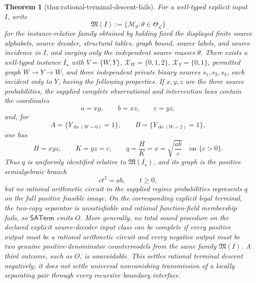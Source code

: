 \documentclass{article}
\newtheorem{theorem}{Theorem}
\begin{document}
\begin{theorem}[thm:rational-terminal-descent-fails]\label{thm:rational-terminal-descent-fails}
For a well-typed explicit input \(I\), write
\[
 \mathfrak M(I):=\{\mathcal M_\theta:\theta\in\Theta_{\mathcal L}\}
\]
for the instance-relative family obtained by holding fixed the displayed finite source alphabets, source decoder, structural tables, graph bound, source labels, and source incidence in \(I\), and varying only the independent source masses \(\theta\).  There exists a well-typed instance \(I_\star\) with \(V=\{W,Y\}\), \(\mathcal X_W=\{0,1,2\}\), \(\mathcal X_Y=\{0,1\}\), permitted graph \(W\to Y\to W\), and three independent private binary sources \(s_1,s_2,s_3\), each incident only to \(Y\), having the following properties.  If \(x,y,z\) are the three source probabilities, the supplied complete observational and intervention laws contain the coordinates
\[
 a=xy,\qquad b=xz,\qquad c=yz,
\]
and, for
\[
 A=\{Y_{\operatorname{do}(W=0)}=1\},\qquad
 B=\{Y_{\operatorname{do}(W=2)}=1\},
\]
one has
\[
 H=xyz,\qquad K=yz=c,
 \qquad q=\frac{H}{K}=x=\sqrt{\frac{ab}{c}}
 \quad\text{on }\{c>0\}.
\]
Thus \(q\) is uniformly identified relative to \(\mathfrak M(I_\star)\), and its graph is the positive semialgebraic branch
\[
 c t^2=ab,\qquad t\geq0,
\]
but no rational arithmetic circuit in the supplied regime probabilities represents \(q\) on the full positive feasible image.  On the corresponding explicit legal terminal, the two-copy separator is unsatisfiable and rational function-field membership fails, so \(\mathsf{SATerm}\) emits \(O\).  More generally, no total sound procedure on the declared explicit source-decoder input class can be complete if every positive output must be a rational arithmetic circuit and every negative output must be two genuine positive-denominator countermodels from the same family \(\mathfrak M(I)\).  A third outcome, such as \(O\), is unavoidable.  This settles rational terminal descent negatively; it does not settle universal nonvanishing transmission of a locally separating pair through every recursive boundary interface.
\end{theorem}
\end{document}
